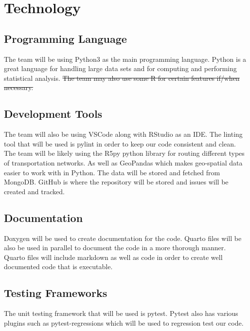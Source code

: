 \documentclass{article}
\begin{document}



\section{Technology}%

\subsection{Programming Language}
The team will be using Python3 as the main programming language. Python is a great language for handling large data sets and for computing and performing statistical analysis. \sout{The team may also use some R for certain features if/when necessary.}

\subsection{Development Tools}
 The team will also be using VSCode along with RStudio as an IDE. The linting tool that will be used is pylint in order to keep our code consistent and clean. The team will be likely using the R5py python library for routing different types of transportation networks. As well as GeoPandas which makes geo-spatial data easier to work with in Python. The data will be stored and fetched from MongoDB. GitHub is where the repository will be stored and issues will be created and tracked.
 
\subsection{Documentation}
Doxygen will be used to create documentation for the code. Quarto files will be also be used in parallel to document the code in a more thorough manner. Quarto files will include markdown as well as code in order to create well documented code that is executable.

\subsection{Testing Frameworks}
The unit testing framework that will be used is pytest. Pytest also has various plugins such as pytest-regressions which will be used to regression test our code.
 
\end{document}
